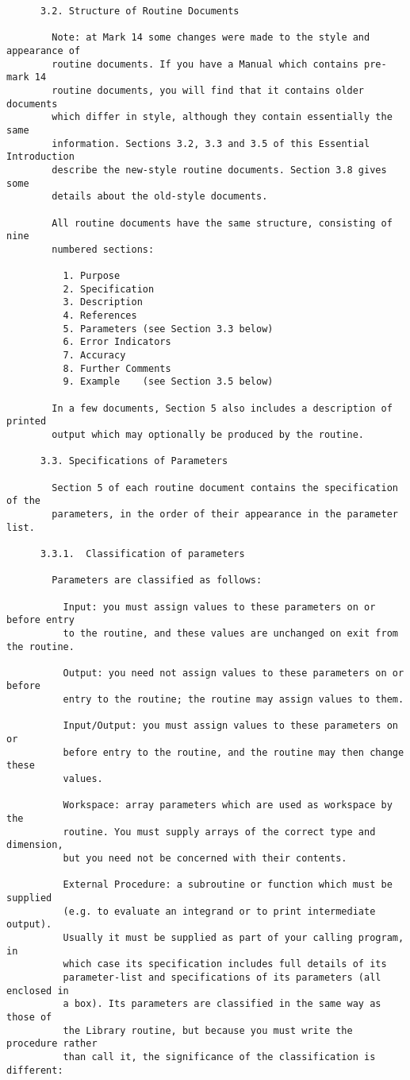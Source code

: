 \begin{small}
\begin{verbatim}
      3.2. Structure of Routine Documents

        Note: at Mark 14 some changes were made to the style and appearance of
        routine documents. If you have a Manual which contains pre-mark 14
        routine documents, you will find that it contains older documents
        which differ in style, although they contain essentially the same
        information. Sections 3.2, 3.3 and 3.5 of this Essential Introduction
        describe the new-style routine documents. Section 3.8 gives some
        details about the old-style documents.

        All routine documents have the same structure, consisting of nine
        numbered sections:

          1. Purpose
          2. Specification
          3. Description
          4. References
          5. Parameters (see Section 3.3 below)
          6. Error Indicators
          7. Accuracy
          8. Further Comments
          9. Example    (see Section 3.5 below)

        In a few documents, Section 5 also includes a description of printed
        output which may optionally be produced by the routine.

      3.3. Specifications of Parameters

        Section 5 of each routine document contains the specification of the
        parameters, in the order of their appearance in the parameter list.

      3.3.1.  Classification of parameters

        Parameters are classified as follows:

          Input: you must assign values to these parameters on or before entry
          to the routine, and these values are unchanged on exit from the routine.

          Output: you need not assign values to these parameters on or before
          entry to the routine; the routine may assign values to them.

          Input/Output: you must assign values to these parameters on or
          before entry to the routine, and the routine may then change these
          values.

          Workspace: array parameters which are used as workspace by the
          routine. You must supply arrays of the correct type and dimension,
          but you need not be concerned with their contents.

          External Procedure: a subroutine or function which must be supplied
          (e.g. to evaluate an integrand or to print intermediate output).
          Usually it must be supplied as part of your calling program, in
          which case its specification includes full details of its
          parameter-list and specifications of its parameters (all enclosed in
          a box). Its parameters are classified in the same way as those of
          the Library routine, but because you must write the procedure rather
          than call it, the significance of the classification is different:


\end{verbatim}
\end{small}
